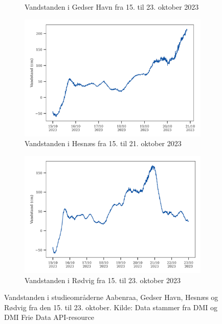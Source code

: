 \begin{figure}[H]
\begin{subfigure}[b]{0.5\textwidth}
        \caption{Vandstanden i Gedser Havn fra 15. til 23. oktober 2023}
        \label{Subfig: Gedser vandstand}
    \end{subfigure}
    \vspace{0.2cm}
    \begin{subfigure}[b]{0.5\textwidth}
        \centering
        \includegraphics[width=1\textwidth]{images/vandstands_grafer/vandstand_hesnaes_vandstandsplot.png}
        \caption{Vandstanden i Hesnæs fra 15. til 21. oktober 2023}
        \label{Subfig: Hesnæs vandstand}
    \end{subfigure}
    \hspace{0.2cm}
    \begin{subfigure}[b]{0.5\textwidth}
        \centering
        \includegraphics[width=1\textwidth]{images/vandstands_grafer/vandstand_praestoe_roedvig_vandstandsplot.png}
        \caption{Vandstanden i Rødvig fra 15. til 23. oktober 2023}
        \label{Subfig: Rødvig vandstand}
    \end{subfigure}
    \caption{Vandstanden i studieområderne Aabenraa, Gedser Havn, Hesnæs og Rødvig fra den 15. til 23. oktober. Kilde: Data stammer fra DMI og DMI Frie Data API-resource}
    \label{Figur: Vandstandsdata}
\end{figure}
